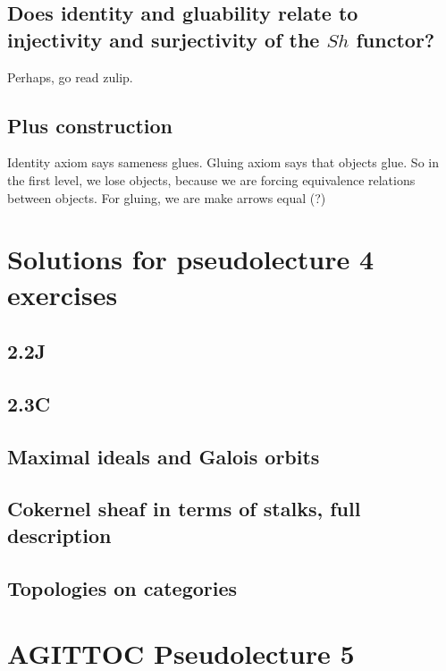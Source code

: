 \documentclass{book}
\theoremstyle{definition}
\begin{document}
\section{Does identity and gluability relate to injectivity and surjectivity of the $Sh$ functor?}
Perhaps, go read zulip.


\section{Plus construction}
Identity axiom says sameness glues. Gluing axiom says that objects glue. So 
in the first level, we lose objects, because we are forcing equivalence relations
between objects. For gluing, we are make arrows equal (?)

\chapter{Solutions for pseudolecture 4 exercises}

\section{2.2J}
\section{2.3C}
\section{Maximal ideals and Galois orbits}
\section{Cokernel sheaf in terms of stalks, full description}
\section{Topologies on categories}


\chapter{AGITTOC Pseudolecture 5}
\end{document}
